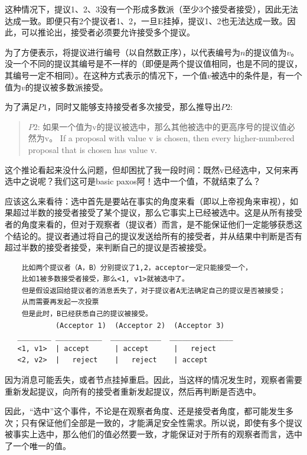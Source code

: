 \documentclass[12pt]{article}
\begin{document}
这种情况下，提议1、2、3没有一个形成多数派（至少3个接受者接受），因此无法达成一致。即便只有2个提议者1、2，一旦E挂掉，提议1、2也无法达成一致。因此，可以推论出，接受者必须要允许接受多个提议。

为了方便表示，将提议进行编号（以自然数正序），以\(<n, v>\)代表编号为\(n\)的提议值为\(v\)。没一个不同的提议其编号是不一样的（即便是两个提议值相同，也是不同的提议，其编号一定不相同）。在这种方式表示的情况下，一个值\(v\)被选中的条件是，有一个值为\(v\)的提议被多数派接受。

为了满足\(P1\)，同时又能够支持接受者多次接受，那么推导出\(P2\):

\begin{quote}
\(P2\): 如果一个值为v的提议被选中，那么其他被选中的更高序号的提议值必然为v。 If a proposal with value v is chosen, then every higher-numbered proposal that is chosen has value v.
\end{quote}

这个推论看起来没什么问题，但却困扰了我一段时间：既然v已经选中，又何来再选中之说呢？我们这可是basic paxos阿！选中一个值，不就结束了么？

应该这么来看待：选中首先是要站在事实的角度来看（即以上帝视角来审视），如果超过半数的接受者接受了某个提议，那么它事实上已经被选中。这是从所有接受者的角度来看的，但对于观察者（提议者）而言，是不能保证他们一定能够获悉这个结论的。提议者通过将自己的提议发送给所有的接受者，并从结果中判断是否有超过半数的接受者接受，来判断自己的提议是否被接受。

\begin{verbatim}
    比如两个提议者（A，B）分别提议了1,2，acceptor一定只能接受一个，
    比如1被多数接受者接受，那么<1, v1>就被选中了。
    但是假设返回给提议者的消息丢失了，对于提议者A无法确定自己的提议是否被接受；
    从而需要再发起一次投票
    但是此时，B已经获悉自己的提议被接受。
            (Acceptor 1)  (Acceptor 2)  (Acceptor 3)
   ________ ___________  ____________  _______________
   <1, v1>  | accept      | accept      |   reject 
   <2, v2>  |   reject    |   reject    | accept
\end{verbatim}

因为消息可能丢失，或者节点挂掉重启。因此，当这样的情况发生时，观察者需要重新发起提议，向所有的接受者重新发起提议，然后再判断是否选中。

因此，``选中''这个事件，不论是在观察者角度、还是接受者角度，都可能发生多次；只有保证他们全部是一致的，才能满足安全性需求。所以说，即使有多个提议被事实上选中，那么他们的值必然要一致，才能保证对于所有的观察者而言，选中了一个唯一的值。
\end{document}

